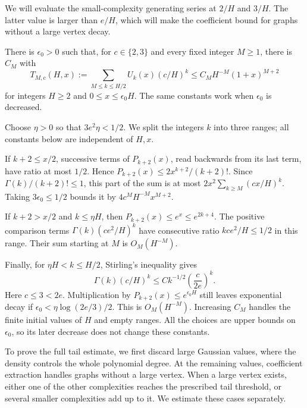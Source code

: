We will evaluate the small-complexity generating series at $2/H$
and $3/H$. The latter value is larger than $e/H$, which will make
the coefficient bound for graphs without a large vertex decay.

\begin{lmm}
\label{lmm:s03:short-series}
There is $\epsilon_0>0$ such that, for $c\in\{2,3\}$ and every
fixed integer $M\geq1$, there is $C_M$ with
\begin{equation}
\label{eq:s03:short-series}
T_{M,c}(H,x):=\sum_{M\leq k\leq H/2}U_k(x)(c/H)^k
\leq C_MH^{-M}(1+x)^{M+2}
\end{equation}
for integers $H\geq2$ and $0\leq x\leq\epsilon_0H$.
The same constants work when $\epsilon_0$ is decreased.
\end{lmm}
\begin{prf}
Choose $\eta>0$ so that $3e^2\eta<1/2$. We split the integers $k$
into three ranges; all constants below are independent of $H,x$.

If $k+2\leq x/2$, successive terms of $P_{k+2}(x)$, read backwards
from its last term, have ratio at most $1/2$. Hence
$P_{k+2}(x)\leq2x^{k+2}/(k+2)!$. Since
$\Gamma(k)/(k+2)!\leq1$, this part of the sum is at most
$2x^2\sum_{k\geq M}(cx/H)^k$. Taking $3\epsilon_0\leq1/2$
bounds it by $4c^MH^{-M}x^{M+2}$.

If $k+2>x/2$ and $k\leq\eta H$, then
$P_{k+2}(x)\leq e^x\leq e^{2k+4}$. The positive comparison terms
$\Gamma(k)(ce^2/H)^k$ have consecutive ratio
$kce^2/H\leq1/2$ in this range. Their sum starting at $M$ is
$O_M(H^{-M})$.

Finally, for $\eta H<k\leq H/2$, Stirling's inequality gives
\[
\Gamma(k)(c/H)^k
\leq Ck^{-1/2}\left(\frac{c}{2e}\right)^k.
\]
Here $c\leq3<2e$. Multiplication by
$P_{k+2}(x)\leq e^{\epsilon_0H}$ still leaves exponential decay
if $\epsilon_0<\eta\log(2e/3)/2$. This is $O_M(H^{-M})$.
Increasing $C_M$ handles the finite initial values of $H$ and empty
ranges. All the choices are upper bounds on $\epsilon_0$, so its
later decrease does not change these constants.
\end{prf}

To prove the full tail estimate, we first discard large Gaussian
values, where the density controls the whole polynomial degree.
At the remaining values, coefficient extraction handles graphs
without a large vertex. When a large vertex exists, either one of
the other complexities reaches the prescribed tail threshold,
or several smaller complexities add up to it. We estimate these
cases separately.

